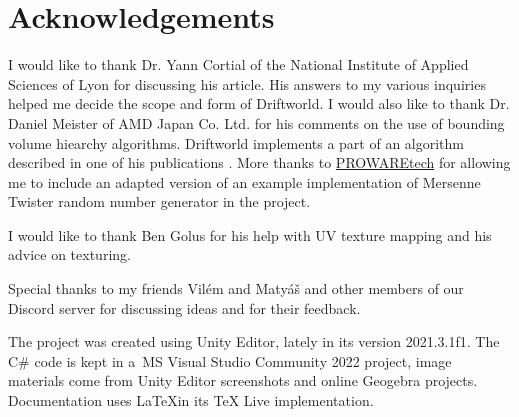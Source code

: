\section*{Acknowledgements}

I would like to thank Dr. Yann Cortial of the National Institute of Applied Sciences of Lyon for discussing his article. His answers to my various inquiries helped me decide the scope and form of Driftworld. I would also like to thank Dr. Daniel Meister of AMD Japan Co. Ltd. for his comments on the use of bounding volume hiearchy algorithms. Driftworld implements a part of an algorithm described in one of his publications \cite{meister}. More thanks to \href{https://www.prowaretech.com}{PROWAREtech} for allowing me to include an adapted version of an example implementation of Mersenne Twister random number generator in the project.

I would like to thank Ben Golus for his help with UV texture mapping and his advice on texturing. %

Special thanks to my friends Vilém and Matyáš and other members of our Discord server for discussing ideas and for their feedback.

The project was created using Unity Editor, lately in its version 2021.3.1f1. The C\# code is kept in a~MS Visual Studio Community 2022 project, image materials come from Unity Editor screenshots and online Geogebra projects. Documentation uses \LaTeX\hspace*{0.3em}in its TeX Live implementation.